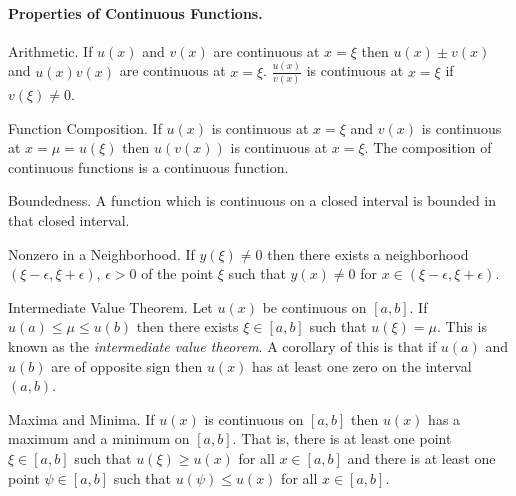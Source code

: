 \paragraph{Properties of Continuous Functions.}
\begin{description}
\item{Arithmetic.}
  If $u(x)$ and $v(x)$ are continuous at $x = \xi$ then $u(x) \pm v(x)$ and
  $u(x) v(x)$ are continuous at $x = \xi$.  $\frac{u(x)}{v(x)}$ is 
  continuous at $x = \xi$ if $v(\xi) \neq 0$.
\item{Function Composition.}
  If $u(x)$ is continuous at $x = \xi$ and $v(x)$ is continuous at 
  $x = \mu = u(\xi)$ then $u(v(x))$ is continuous at $x = \xi$.  The 
  composition of continuous functions is a continuous function.
\item{Boundedness.}
  A function which is continuous on a closed interval is bounded in that
  closed interval.
\item{Nonzero in a Neighborhood.}
  If $y(\xi) \neq 0$ then there exists a neighborhood 
  $(\xi-\epsilon,\xi+\epsilon)$, $\epsilon > 0$ of the point $\xi$ such that
  $y(x) \neq 0$ for $x \in (\xi - \epsilon, \xi + \epsilon)$.
\item{Intermediate Value Theorem.}
  Let $u(x)$ be continuous on $[a,b]$.
  If $u(a) \leq \mu \leq u(b)$ then there exists $\xi \in [a,b]$ such that
  $u(\xi) = \mu$.  This is known as the \textit{intermediate value theorem}.
  A corollary of this is that if $u(a)$ and $u(b)$ are of opposite sign then
  $u(x)$ has at least one zero on the interval $(a,b)$.
\item{Maxima and Minima.}
  If $u(x)$ is continuous on $[a,b]$ then $u(x)$ has a maximum and a 
  minimum on $[a,b]$.  That is, there is at least one point $\xi \in [a,b]$ 
  such that $u(\xi) \geq u(x)$ for all $x \in [a,b]$ and there is at least one
  point $\psi \in [a,b]$ such that $u(\psi) \leq u(x)$ for all $x \in [a,b]$. 
\end{description}






